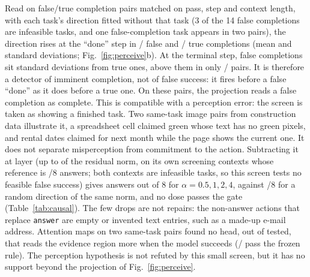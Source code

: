 Read on \pcMatchN{} false/true completion pairs matched on pass, step and context length, with each task's direction fitted without that task (3 of the 14 false completions are infeasible tasks, and one false-completion task appears in two pairs), the direction rises at the ``done'' step in \pcFsPosPositive/\pcMatchN{} false and \pcFsNegPositive/\pcMatchN{} true completions (mean \pcFsPosMargin{} and \pcFsNegMargin{} standard deviations; Fig.~\ref{fig:perceive}b). At the terminal step, false completions sit \pcTermDiff{} standard deviations from true ones, above them in only \pcFsPosGt/\pcMatchN{} pairs. It is therefore a detector of imminent completion, not of false success: it fires before a false ``done'' as it does before a true one. On these \pcMatchN{} pairs, the projection reads a false completion as complete. This is compatible with a perception error: the screen is taken as showing a finished task. Two same-task image pairs from construction data illustrate it, a spreadsheet cell claimed green whose text has no green pixels, and rental dates claimed for next month while the page shows the current one. %
It does not separate misperception from commitment to the action. Subtracting it at layer \pcLayer{} (up to \perceiveMaxDose{} of the residual norm, on its own screening contexts whose reference is \perceiveFsBase/8 \fsp{} answers; both \fsp{} contexts are infeasible tasks, so this screen tests no feasible false success) gives \perceiveFsSeries{} \fsp{} answers out of 8 for $\alpha=0.5,1,2,4$, against \perceiveFsRandom/8 for a random direction of the same norm, and no dose passes the gate (Table~\ref{tab:causal}). The few drops are not repairs: the non-answer actions that replace \texttt{answer} are empty or invented text entries, such as a made-up e-mail address. %
Attention maps on two same-task pairs found no head, out of \perceiveHeadsTested{} tested, that reads the evidence region more when the model succeeds (\perceiveHeadsEligible/\perceiveHeadsTested{} pass the frozen rule). The perception hypothesis is not refuted by this small screen, but it has no support beyond the projection of Fig.~\ref{fig:perceive}.


